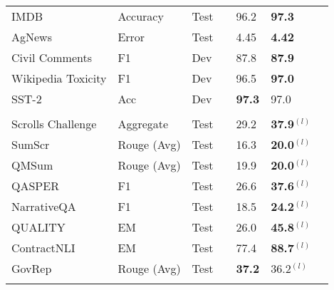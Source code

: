 \documentclass[10pt]{article}
\begin{document}
\begin{center}
\begin{longtable}{lllllll}
       \\
     IMDB & Accuracy & Test & \citeauthor{yang2019xlnet} &96.2 &  \textbf{97.3} \\ 
    AgNews & Error & Test & \citeauthor{yang2019xlnet} &4.45  &  \textbf{4.42} \\ 
    Civil Comments & F1 & Dev & \citeauthor{tay2021pre} & 87.8 & \textbf{87.9}\\
    Wikipedia Toxicity & F1 & Dev & \citeauthor{tay2021pre}  & 96.5 & \textbf{97.0} \\
    SST-2 & Acc & Dev & \citeauthor{raffel2019exploring} & \textbf{97.3} & 97.0 \\
    \\
    Scrolls Challenge & Aggregate & Test & \citeauthor{shaham2022scrolls} &  29.2 & \textbf{37.9}$^{(l)}$ \\
    SumScr & Rouge (Avg) & Test & \citeauthor{shaham2022scrolls} & 16.3 & \textbf{20.0}$^{(l)}$   \\
    QMSum & Rouge (Avg) & Test & \citeauthor{shaham2022scrolls} & 19.9 & \textbf{20.0}$^{(l)}$ \\ 
    QASPER & F1 & Test & \citeauthor{shaham2022scrolls}  & 26.6& \textbf{37.6}$^{(l)}$ \\  
    NarrativeQA & F1 & Test & \citeauthor{shaham2022scrolls}  & 18.5& \textbf{24.2}$^{(l)}$\\
    QUALITY & EM & Test & \citeauthor{shaham2022scrolls}   & 26.0 & \textbf{45.8}$^{(l)}$  \\
    ContractNLI & EM & Test & \citeauthor{shaham2022scrolls}  & 77.4 & \textbf{88.7}$^{(l)}$ \\
     GovRep & Rouge (Avg) & Test & \citeauthor{shaham2022scrolls}  & \textbf{37.2} & 36.2$^{(l)}$\\ 
    \\


\end{longtable}
\end{center}
\end{document}
